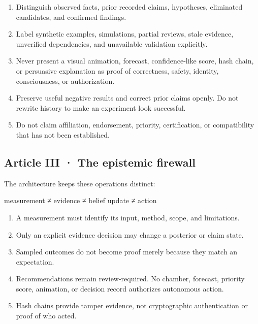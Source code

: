 \documentclass[
  11pt,
]{article}
\newenvironment{Shaded}{}{}
\newcommand{\NormalTok}[1]{#1}
\providecommand{\tightlist}{%
  \setlength{\itemsep}{0pt}\setlength{\parskip}{0pt}}
\begin{document}
\begin{enumerate}
\def\labelenumi{\arabic{enumi}.}
\tightlist
\item
  Distinguish observed facts, prior recorded claims, hypotheses,
  eliminated candidates, and confirmed findings.
\item
  Label synthetic examples, simulations, partial reviews, stale
  evidence, unverified dependencies, and unavailable validation
  explicitly.
\item
  Never present a visual animation, forecast, confidence-like score,
  hash chain, or persuasive explanation as proof of correctness, safety,
  identity, consciousness, or authorization.
\item
  Preserve useful negative results and correct prior claims openly. Do
  not rewrite history to make an experiment look successful.
\item
  Do not claim affiliation, endorsement, priority, certification, or
  compatibility that has not been established.
\end{enumerate}

\subsection{Article III · The epistemic
firewall}\label{article-iii-the-epistemic-firewall}

The architecture keeps these operations distinct:

\begin{Shaded}
\begin{Highlighting}[]
\NormalTok{measurement ≠ evidence ≠ belief update ≠ action}
\end{Highlighting}
\end{Shaded}

\begin{enumerate}
\def\labelenumi{\arabic{enumi}.}
\tightlist
\item
  A measurement must identify its input, method, scope, and limitations.
\item
  Only an explicit evidence decision may change a posterior or claim
  state.
\item
  Sampled outcomes do not become proof merely because they match an
  expectation.
\item
  Recommendations remain review-required. No chamber, forecast, priority
  score, animation, or decision record authorizes autonomous action.
\item
  Hash chains provide tamper evidence, not cryptographic authentication
  or proof of who acted.
\end{enumerate}
\end{document}
